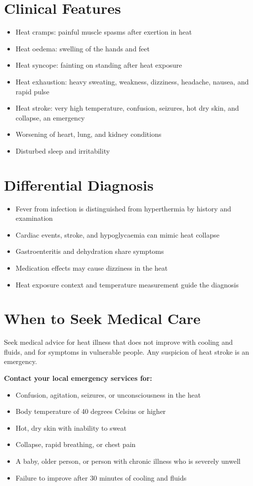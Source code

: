 \section*{Clinical Features}
\begin{itemize}
    \item Heat cramps: painful muscle spasms after exertion in heat
    \item Heat oedema: swelling of the hands and feet
    \item Heat syncope: fainting on standing after heat exposure
    \item Heat exhaustion: heavy sweating, weakness, dizziness, headache, nausea, and rapid pulse
    \item Heat stroke: very high temperature, confusion, seizures, hot dry skin, and collapse, an emergency
    \item Worsening of heart, lung, and kidney conditions
    \item Disturbed sleep and irritability
\end{itemize}

\section*{Differential Diagnosis}
\begin{itemize}
    \item Fever from infection is distinguished from hyperthermia by history and examination
    \item Cardiac events, stroke, and hypoglycaemia can mimic heat collapse
    \item Gastroenteritis and dehydration share symptoms
    \item Medication effects may cause dizziness in the heat
    \item Heat exposure context and temperature measurement guide the diagnosis
\end{itemize}

\section*{When to Seek Medical Care}
Seek medical advice for heat illness that does not improve with cooling and fluids, and for symptoms in vulnerable people. Any suspicion of heat stroke is an emergency.

\textbf{Contact your local emergency services for:}
\begin{itemize}
    \item Confusion, agitation, seizures, or unconsciousness in the heat
    \item Body temperature of 40 degrees Celsius or higher
    \item Hot, dry skin with inability to sweat
    \item Collapse, rapid breathing, or chest pain
    \item A baby, older person, or person with chronic illness who is severely unwell
    \item Failure to improve after 30 minutes of cooling and fluids
\end{itemize}

